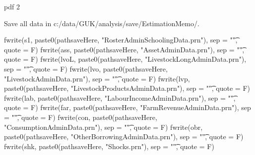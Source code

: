 \begin{Schunk}
\begin{Soutput}
pdf 
  2 
\end{Soutput}
\end{Schunk}





Save all data in c:/data/GUK/analysis/save/EstimationMemo/.

\begin{Schunk}
\begin{Sinput}
fwrite(s1, paste0(pathsaveHere, "RosterAdminSchoolingData.prn"), sep = "\t", quote = F)
fwrite(ass, paste0(pathsaveHere, "AssetAdminData.prn"), sep = "\t", quote = F)
fwrite(lvoL, paste0(pathsaveHere, "LivestockLongAdminData.prn"), sep = "\t", quote = F)
fwrite(lvo, paste0(pathsaveHere, "LivestockAdminData.prn"), sep = "\t", quote = F)
fwrite(lvp, paste0(pathsaveHere, "LivestockProductsAdminData.prn"), sep = "\t", quote = F)
fwrite(lab, paste0(pathsaveHere, "LabourIncomeAdminData.prn"), sep = "\t", quote = F)
fwrite(far, paste0(pathsaveHere, "FarmRevenueAdminData.prn"), sep = "\t", quote = F)
fwrite(con, paste0(pathsaveHere, "ConsumptionAdminData.prn"), sep = "\t", quote = F)
fwrite(obr, paste0(pathsaveHere, "OtherBorrowingAdminData.prn"), sep = "\t", quote = F)
fwrite(shk, paste0(pathsaveHere, "Shocks.prn"), sep = "\t", quote = F)
\end{Sinput}
\end{Schunk}





